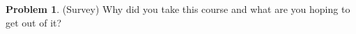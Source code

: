 \documentclass[10pt]{amsart}
\theoremstyle{definition}
\newtheorem{problem}{Problem} %
\begin{document}

\begin{problem}(Survey)
  Why did you take this course and what are you hoping to get out of it?
\end{problem}
\end{document}
